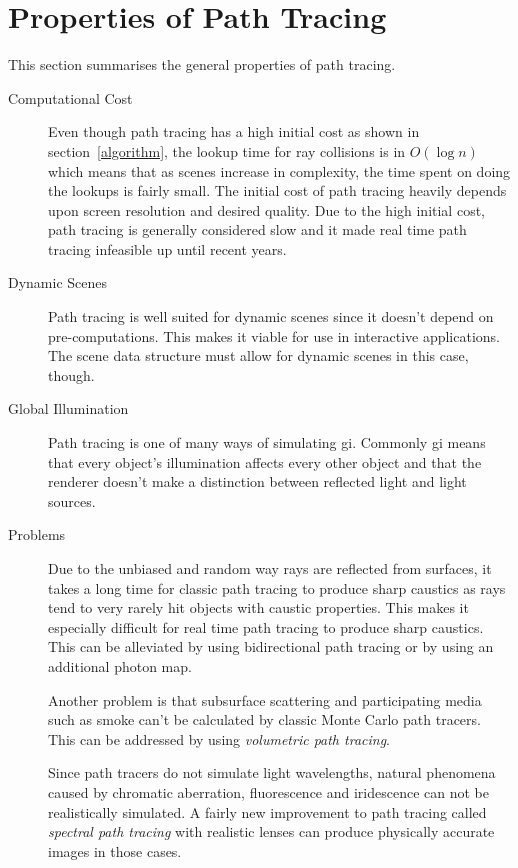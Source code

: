 \documentclass[
  twoside,
  11pt, a4paper,
  footinclude=true,
  headinclude=true,
  cleardoublepage=empty
]{scrreprt}
\begin{document}
\section{Properties of Path Tracing}
This section summarises the general properties of path tracing.

\begin{description}
    \item[Computational Cost]
        Even though path tracing has a high initial cost as shown in section~\ref{algorithm}, the lookup time for ray collisions is in
        \(O(\log n)\) which means that as scenes increase in complexity, the time spent on doing the
        lookups is fairly small. The initial cost of path tracing heavily depends upon screen resolution
        and desired quality. Due to the high initial cost, path tracing is generally considered slow and
        it made real time path tracing infeasible up until recent years.

    \item[Dynamic Scenes]
        Path tracing is well suited for dynamic scenes since it doesn't depend on pre-computations. This
        makes it viable for use in interactive applications. The scene data structure must allow for
        dynamic scenes in this case, though.

    \item[Global Illumination]
        Path tracing is one of many ways of simulating \acf{gi}.
        Commonly \ac{gi} means that every object's illumination affects every other object and that the
        renderer doesn't make a distinction between reflected light and light sources.

    \item[Problems]
        Due to the unbiased and random way rays are reflected from surfaces, it takes a long time for
        classic path tracing to
        produce sharp caustics as rays tend to very rarely hit objects with caustic properties. This makes
        it especially difficult for real time path tracing to produce sharp caustics. This can be
        alleviated by using bidirectional path tracing or by using an additional photon map.

        Another problem is that subsurface scattering and participating media such as smoke can't be
        calculated by classic Monte Carlo path
        tracers. This can be addressed by using \emph{volumetric path tracing}.
        \cite{wiki:volumetric-path-tracing} \cite{incollection:volumetric-path-tracing}

        Since path tracers do not simulate light wavelengths, natural phenomena caused by chromatic
        aberration, fluorescence and iridescence can not be realistically simulated. A fairly new
        improvement to path tracing called \emph{spectral path tracing} with realistic lenses can produce
        physically accurate images in those cases. \cite{inproceedings:realistic-lenses} \cite{site:lambda}
        \cite{site:luculentus} \cite{site:robigo-luculenta}
\end{description}
\end{document}

